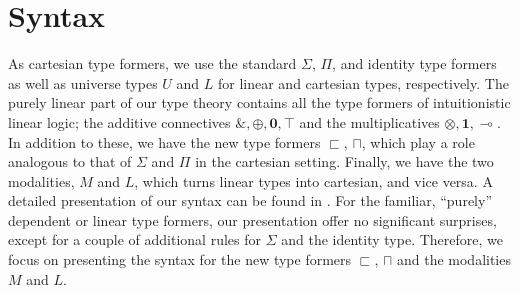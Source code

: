 \documentclass[a4paper,english]{lipics-v2018}
\begin{document}
\section{Syntax}\label{syntax}
As cartesian type formers, we use the standard $\Sigma$, $\Pi$, and identity type formers as well as universe types $U$ and $L$ for linear and cartesian types, respectively.
The purely linear part of our type theory contains all the type formers of intuitionistic linear logic; the additive connectives $\&,\oplus,\mathbf{0},\top$ and the multiplicatives $\otimes,\mathbf{1},\multimap$. In addition to these, we have the new type formers $\sqsubset$, $\sqcap$, which play a role analogous to that of $\Sigma$ and $\Pi$ in the cartesian setting.
Finally, we have the two modalities, $M$ and $L$, which turns linear types into cartesian, and vice versa.
A detailed presentation of our syntax can be found in \cite{MLundfall}. For the familiar, ``purely'' dependent or linear type formers, our presentation offer no significant surprises, except for a couple of additional rules for $\Sigma$ and the identity type. Therefore, we focus on presenting the syntax for the new type formers $\sqsubset$, $\sqcap$ and the modalities $M$ and $L$.
\end{document}
